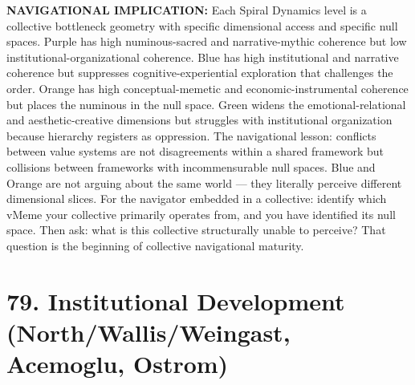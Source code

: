 \textbf{NAVIGATIONAL IMPLICATION:} Each Spiral Dynamics level is a collective bottleneck geometry with specific dimensional access and specific null spaces. Purple has high numinous-sacred and narrative-mythic coherence but low institutional-organizational coherence. Blue has high institutional and narrative coherence but suppresses cognitive-experiential exploration that challenges the order. Orange has high conceptual-memetic and economic-instrumental coherence but places the numinous in the null space. Green widens the emotional-relational and aesthetic-creative dimensions but struggles with institutional organization because hierarchy registers as oppression. The navigational lesson: conflicts between value systems are not disagreements within a shared framework but collisions between frameworks with incommensurable null spaces. Blue and Orange are not arguing about the same world — they literally perceive different dimensional slices. For the navigator embedded in a collective: identify which vMeme your collective primarily operates from, and you have identified its null space. Then ask: what is this collective structurally unable to perceive? That question is the beginning of collective navigational maturity.


\bigskip\noindent\makebox[\textwidth]{\color{rulegray}\rule{5cm}{0.3pt}}\bigskip


\section*{79. Institutional Development (North/Wallis/Weingast, Acemoglu, Ostrom)}



